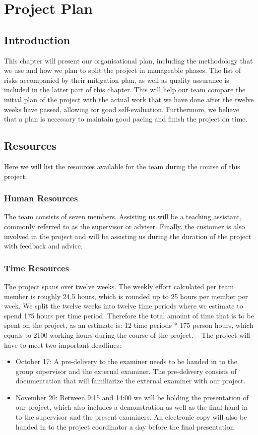 \documentclass[../document.tex]{subfiles}
\begin{document}
\section{Project Plan}
\subsection{Introduction}
This chapter will present our organisational plan, including the methodology that we use and how we plan to split the project in manageable phases. The list of risks accompanied by their mitigation plan, as well as quality assurance is included in the latter part of this chapter. This will help our team compare the initial plan of the project with the actual work that we have done after the twelve weeks have passed, allowing for good self-evaluation. Furthermore, we believe that a plan is necessary to maintain good pacing and finish the project on time.

\subsection{Resources}
Here we will list the resources available for the team during the course of this project.

\subsubsection{Human Resources}
The team consists of seven members. Assisting us will be a teaching assistant, commonly referred to as the supervisor or adviser. Finally, the customer is also involved in the project and will be assisting us during the duration of the project with feedback and advice.

\subsubsection{Time Resources}
The project spans over twelve weeks. The weekly effort calculated per team member is roughly 24.5 hours, which is rounded up to 25 hours per member per week. We split the twelve weeks into twelve time periods where we estimate to spend 175 hours per time period. Therefore the total amount of time that is to be spent on the project, as an estimate  is: 12 time periods * 175 person hours, which equals to 2100 working hours during the course of the project.
\newline \ \newline
The project will have to meet two important deadlines:
\begin{itemize}
\item
October 17: A pre-delivery to the examiner needs to be handed in to the group supervisor and the external examiner. The pre-delivery consists of documentation that will familiarize the external examiner with our project.
\item
November 20: Between 9:15 and 14:00 we will be holding the presentation of our project, which also includes a demonstration as well as the final hand-in to the supervisor and the present examiners. An electronic copy will also be handed in to the project coordinator a day before the final presentation.
\end{itemize}
\end{document}
